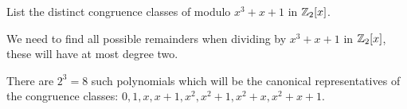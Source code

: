 \documentclass[../hw6]{subfiles}
\begin{document}
\begin{problem}
List the distinct congruence classes of modulo $x^3 + x + 1$ in $\mathbb{Z}_2[x]$.
\end{problem}
We need to find all possible remainders when dividing by $x^3 + x + 1$ in $\mathbb{Z}_2[x]$,
these will have at most degree two.

There are $2^3=8$ such polynomials which will be the canonical representatives of the congruence classes:
$0,1,x,x + 1,x^2,x^2 + 1,x^2 + x,x^2 + x + 1$.
\end{document}
